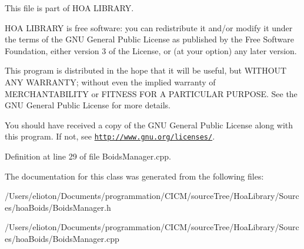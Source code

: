This file is part of H\-O\-A L\-I\-B\-R\-A\-R\-Y.

H\-O\-A L\-I\-B\-R\-A\-R\-Y is free software\-: you can redistribute it and/or modify it under the terms of the G\-N\-U General Public License as published by the Free Software Foundation, either version 3 of the License, or (at your option) any later version.

This program is distributed in the hope that it will be useful, but W\-I\-T\-H\-O\-U\-T A\-N\-Y W\-A\-R\-R\-A\-N\-T\-Y; without even the implied warranty of M\-E\-R\-C\-H\-A\-N\-T\-A\-B\-I\-L\-I\-T\-Y or F\-I\-T\-N\-E\-S\-S F\-O\-R A P\-A\-R\-T\-I\-C\-U\-L\-A\-R P\-U\-R\-P\-O\-S\-E. See the G\-N\-U General Public License for more details.

You should have received a copy of the G\-N\-U General Public License along with this program. If not, see \href{http://www.gnu.org/licenses/}{\tt http\-://www.\-gnu.\-org/licenses/}. 

Definition at line 29 of file Boids\-Manager.\-cpp.



The documentation for this class was generated from the following files\-:\begin{DoxyCompactItemize}
\item 
/\-Users/elioton/\-Documents/programmation/\-C\-I\-C\-M/source\-Tree/\-Hoa\-Library/\-Sources/hoa\-Boids/Boids\-Manager.\-h\item 
/\-Users/elioton/\-Documents/programmation/\-C\-I\-C\-M/source\-Tree/\-Hoa\-Library/\-Sources/hoa\-Boids/Boids\-Manager.\-cpp\end{DoxyCompactItemize}

